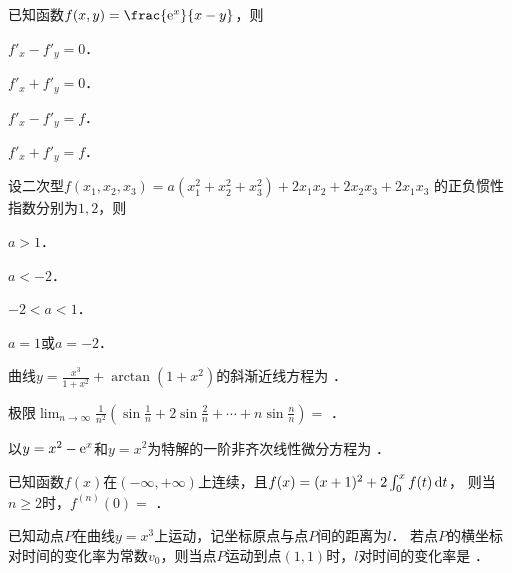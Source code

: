 \documentclass[plain,noanswer,medmath]{../../template/jnuexam}
\begin{document}
\begin{problem}
已知函数$f(x,y) = \frac{\e^x}{x - y}$，则\pickout{}
\begin{abcd}
\item $f'_x - f'_y = 0$．
\item $f'_x + f'_y = 0$．
\item $f'_x - f'_y = f$．
\item $f'_x + f'_y = f$．
\end{abcd}
\end{problem}




\begin{problem}
设二次型$f(x_1,x_2,x_3) = a(x_1^2 + x_2^2 + x_3^2) + 2x_1x_2 + 2x_2x_3 + 2x_1x_3$
的正负惯性指数分别为$1,2$，则\pickout{}
\begin{abcd}
\item $a > 1$．
\item $a < - 2$．
\item $- 2 < a < 1$．
\item $a = 1$或$a = - 2$．
\end{abcd}
\end{problem}




\begin{problem}
曲线$y = \frac{x^3}{1 + x^2} + \arctan(1 + x^2)$的斜渐近线方程为 \fillin{}．
\end{problem}


\begin{problem}
极限$\lim_{n \to \infty} \frac{1}{n^2}\left(\sin\frac{1}{n} + 2\sin\frac{2}{n}
+ \cdots + n\sin\frac{n}{n}\right) =$ \fillin{}．
\end{problem}


\begin{problem}
以$y = x^2 - \mathrm{e}^x$和$y = x^2$为特解的一阶非齐次线性微分方程为 \fillin{}．
\end{problem}


\begin{problem}
已知函数$f(x)$在$(-\infty,+\infty)$上连续，且$f(x) = (x + 1)^2 + 2\int_0^x f(t) \mathop{}\!\mathrm{d} t$，
则当$n \ge 2$时，$f^{(n)}(0) =$ \fillin{}．
\end{problem}


\begin{problem}
已知动点$P$在曲线$y = x^3$上运动，记坐标原点与点$P$间的距离为$l$．
若点$P$的横坐标对时间的变化率为常数$v_0$，则当点$P$运动到点$(1,1)$时，$l$对时间的变化率是 \fillin{}．
\end{problem}
\end{document}
